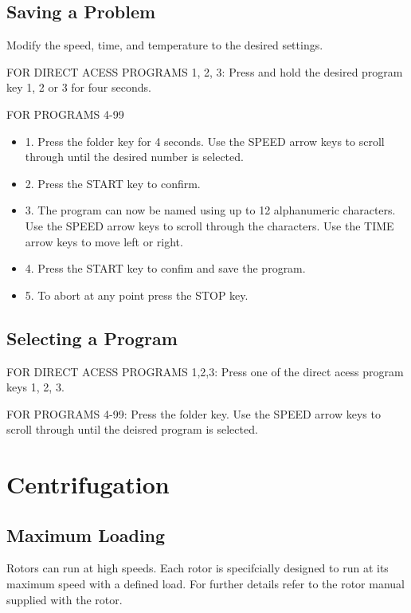 \documentclass[12pt]{../SOP3_beta}
\begin{document}
\subsection*{Saving a Problem}

\NP Modify the speed, time, and temperature to the desired settings. 

\NP FOR DIRECT ACESS PROGRAMS 1, 2, 3: Press and hold the desired program key 1, 2 or 3 for four seconds. 

\NP FOR PROGRAMS 4-99

\begin{itemize}
  \item 1. Press the folder key for 4 seconds. Use the SPEED arrow keys to scroll through until the desired number is selected.
  \item 2. Press the START key to confirm.
  \item 3. The program can now be named using up to 12 alphanumeric characters. Use the SPEED arrow keys to scroll through the characters. Use the TIME arrow keys to move left or right.
  \item 4. Press the START key to confim and save the program. 
  \item 5. To abort at any point press the STOP key.
\end{itemize}

\subsection*{Selecting a Program}

\NP FOR DIRECT ACESS PROGRAMS 1,2,3: Press one of the direct acess program keys 1, 2, 3.

\NP FOR PROGRAMS 4-99: Press the folder key. Use the SPEED arrow keys to scroll through until the deisred program is selected. 

\section{Centrifugation}

\subsection*{Maximum Loading}

\NP Rotors can run at high speeds. Each rotor is specifcially designed to run at its maximum speed with a defined load. For further details refer to the rotor manual supplied with the rotor. 
\end{document}
